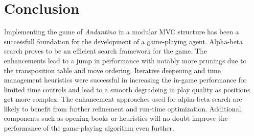 \section{Conclusion}
Implementing the game of \textit{Andantino} in a modular MVC structure has been a successfull foundation for the development of a game-playing agent. Alpha-beta search proves to be an efficient search framework for the game. The enhancements lead to a jump in performance with notably more prunings due to the transposition table and move ordering. Iterative deepening and time management heuristics were successful in increasing the in-game performance for limited time controls and lead to a smooth degradeing in play quality as positions get more complex. The enhancement approaches used for alpha-beta search are likely to benefit from further refinement and run-time optimization. Additional components such as opening books or heuristics will no doubt improve the performance of the game-playing algorithm even further.